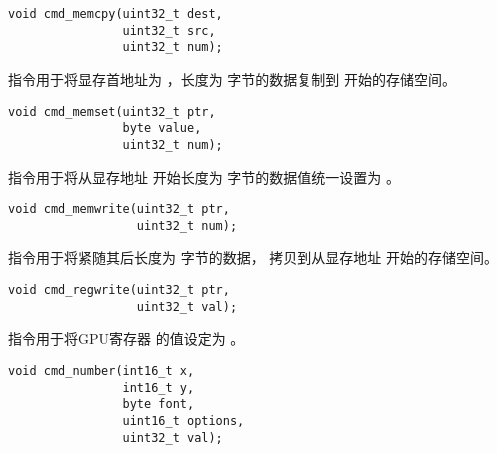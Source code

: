 
\begin{framed}
\begin{verbatim}
void cmd_memcpy(uint32_t dest,
                uint32_t src,
                uint32_t num);
\end{verbatim}
\end{framed}

 指令用于将显存首地址为 ，长度为  字节的数据复制到  开始的存储空间。


\begin{framed}
\begin{verbatim}
void cmd_memset(uint32_t ptr,
                byte value,
                uint32_t num);
\end{verbatim}
\end{framed}

 指令用于将从显存地址  开始长度为  字节的数据值统一设置为  。


\begin{framed}
\begin{verbatim}
void cmd_memwrite(uint32_t ptr,
                  uint32_t num);
\end{verbatim}
\end{framed}

 指令用于将紧随其后长度为  字节的数据，
拷贝到从显存地址  开始的存储空间。


\begin{framed}
\begin{verbatim}
void cmd_regwrite(uint32_t ptr,
                  uint32_t val);
\end{verbatim}
\end{framed}

 指令用于将GPU寄存器  的值设定为  。



\begin{framed}
\begin{verbatim}
void cmd_number(int16_t x,
                int16_t y,
                byte font,
                uint16_t options,
                uint32_t val);
\end{verbatim}
\end{framed}

